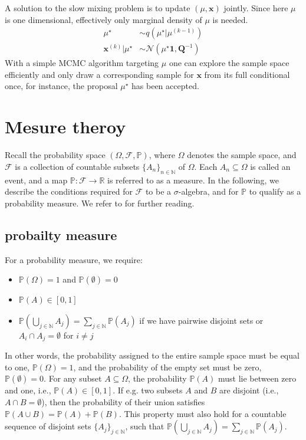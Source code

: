 A solution to the slow mixing problem is to update $(\mu, \bm{x})$ jointly.
Since here $\mu$ is one dimensional, effectively only marginal density of $\mu$ is needed.
\begin{align}
	\mu^{\star}  &\sim q (\mu^{\star}|	\mu^{(k-1)} ) \\
	\bm{x}^{(k)} | \mu^{\star} &\sim \mathcal{N} (	\mu^{\star}\bm{1}, \bm{Q}^{-1}) 
\end{align}
With a simple MCMC algorithm targeting  $ \mu$ one can explore the sample space efficiently and only draw a corresponding sample for $\bm{x}$ from its full conditional once, for instance, the proposal $\mu^{\star}$ has been accepted.

\chapter{Mesure theroy}
\label{ch:Mesure}
Recall the probability space $(\Omega, \mathcal{F}, \mathbb{P})$, where $\Omega$ denotes the sample space, and $\mathcal{F}$ is a collection of countable subsets $\{ A_n \}_{n \in \mathbb{N}}$ of $\Omega$. Each $A_n \subseteq \Omega$ is called an event, and a map $\mathbb{P} : \mathcal{F} \rightarrow \mathbb{R}$ is referred to as a measure.
In the following, we describe the conditions required for $\mathcal{F}$ to be a $\sigma$-algebra, and for $\mathbb{P}$ to qualify as a probability measure.
We refer to \cite{lawler2016notes} \cite{kopp2004measintprob} for further reading.

\section{probailty measure}
For a probability measure, we require:
\begin{itemize}
	\item $\mathbb{P}(\Omega) = 1$ and $\mathbb{P}(\emptyset) = 0$
	\item $\mathbb{P}(A) \in [0,1]$
	\item $\mathbb{P}(\bigcup_{j \in \mathbb{N}} A_j )= \sum_{j \in \mathbb{N}}  \mathbb{P}(A_j)$ if we have pairwise disjoint sets or $A_i \cap A_j = \emptyset$ for $i \neq j $
\end{itemize}
In other words, the probability assigned to the entire sample space must be equal to one, $\mathbb{P}(\Omega) = 1$, and the probability of the empty set must be zero, $\mathbb{P}(\emptyset) = 0$. For any subset $A \subseteq \Omega$, the probability $\mathbb{P}(A)$ must lie between zero and one, i.e., $\mathbb{P}(A) \in [0,1]$.
If e.g. two subsets $A$ and $B$ are disjoint (i.e., $A \cap B = \emptyset$), then the probability of their union satisfies $\mathbb{P}(A \cup B) = \mathbb{P}(A) + \mathbb{P}(B)$.
This property must also hold for a countable sequence of disjoint sets $\{A_j\}_{j \in \mathbb{N}}$, such that $\mathbb{P}\left( \bigcup_{j \in \mathbb{N}} A_j \right) = \sum_{j \in \mathbb{N}} \mathbb{P}(A_j)$.

